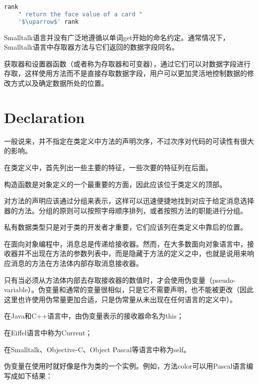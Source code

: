 \begin{lstlisting}[language=bash]
rank 
	" return the face value of a card "
	'$\uparrow$' rank
\end{lstlisting}



Smalltalk语言并没有广泛地遵循以单词get开始的命名约定。通常情况下，Smalltalk语言中存取器方法与它们返回的数据字段同名。

获取器和设置器函数（或者称为存取器和可变器），通过它们可以对数据字段进行存取，这样使用方法而不是直接存取数据字段，用户可以更加灵活地控制数据的修改方式以及确定数据所处的位置。


\section{Declaration}


一般说来，并不指定在类定义中方法的声明次序，不过次序对代码的可读性有很大的影响。

\begin{compactitem}
\item 在类定义中，首先列出一些主要的特征，一些次要的特征列在后面。
\item 构造函数是对象定义的一个最重要的方面，因此应该位于类定义的顶部。
\item 对方法的声明应该通过分组来表示，这样可以迅速便捷地找到对应于给定消息选择器的方法。分组的原则可以按照字母顺序排列，或者按照方法的职能进行分组。
\item 私有数据类型只是对于类的开发者才重要，它们应该列在类定义中靠后的位置。
\end{compactitem}


在面向对象编程中，消息总是传递给接收器。然而，在大多数面向对象语言中，接收器并不出现在方法的参数列表中，而是隐藏于方法的定义之中，也就是说用来响应消息的方法在方法体内部存取消息接收器。

只有当必须从方法体内部去存取接收器的数值时，才会使用伪变量（pseudo-variable）。伪变量和通常的变量很相似，只是它不需要声明，也不能被更改（因此这里也许使用伪常量更加合适，只是伪常量从未出现在任何语言的定义中）。

\begin{compactitem}
\item 在Java和C++语言中，由伪变量表示的接收器命名为this；
\item 在Eiffel语言中称为Current；
\item 在Smalltalk、Objective-C、Object Pascal等语言中称为self。
\end{compactitem}

伪变量在使用时就好像是作为类的一个实例。例如，方法color可以用Pascal语言编写成如下结果：

